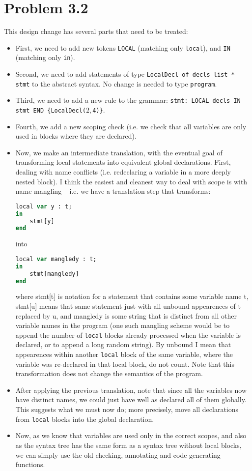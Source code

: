 \section{Problem 3.2}

This design change has several parts that need to be treated:
\begin{itemize}
\item First, we need to add new tokens \texttt{LOCAL} (matching only \texttt{local}), and \texttt{IN} (matching only \texttt{in}).
\item Second, we need to add statements of type \texttt{LocalDecl of decls list * stmt} to the abstract syntax. No change is needed to type \texttt{program}.
\item Third, we need to add a new rule to the grammar: \texttt{stmt: LOCAL decls IN stmt END \{LocalDecl($2, $4)\}}.
\item Fourth, we add a new scoping check (i.e. we check that all variables are only used in blocks where they are declared).
\item
\begin{minipage}[t]{\linewidth}
    Now, we make an intermediate translation, with the eventual goal of transforming local statements into equivalent global declarations.  First, dealing with name conflicts (i.e. redeclaring a variable in a more deeply nested block). I think the easiest and cleanest way to deal with scope is with name mangling -- i.e. we have a translation step that transforms:
\begin{lstlisting}[language=pascal]
local var y : t;
in
    stmt[y]
end
\end{lstlisting}

into
\begin{lstlisting}[language=pascal]
local var mangledy : t;
in
    stmt[mangledy]
end
\end{lstlisting}
where stmt[t] is notation for a statement that contains some variable name t, stmt[u] means that same statement just with all unbound appearences of t replaced by u, and mangledy is some string that is distinct from all other variable names in the program (one such mangling scheme would be to append the number of \texttt{local} blocks already processed when the variable is declared, or to append a long random string). By unbound I mean that appearences within another \texttt{local} block of the same variable, where the variable was re-declared in that local block, do not count. Note that this transformation does not change the semantics of the program.
\end{minipage}
\item After applying the previous translation, note that since all the variables now have distinct names, we could just have well as declared all of them globally. This suggests what we must now do; more precisely, move all declarations from \texttt{local} blocks into the global declaration.
\item Now, as we know that variables are used only in the correct scopes, and also as the syntax tree has the same form as a syntax tree without local blocks, we can simply use the old checking, annotating and code generating functions.
\end{itemize}

